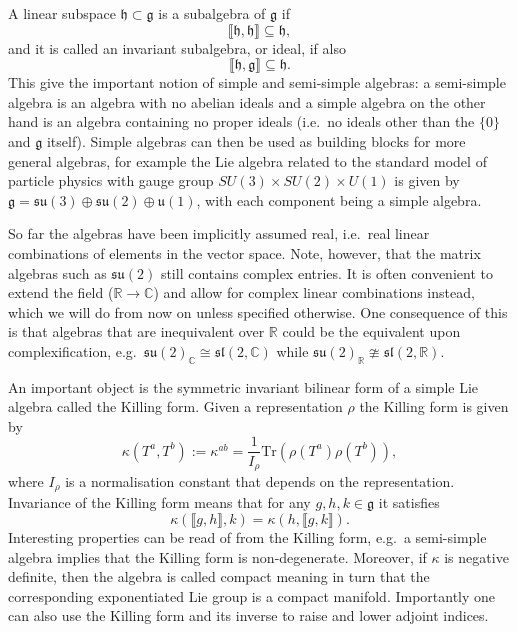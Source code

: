 A linear subspace $\mathfrak{h}\subset \mathfrak{g}$ is a subalgebra of $\mathfrak{g}$ if \begin{equation}
    \llbracket\mathfrak{h},\mathfrak{h}\rrbracket\subseteq \mathfrak{h},
\end{equation} 
and it is called an invariant subalgebra, or ideal, if also
\begin{equation}
    \llbracket\mathfrak{h},\mathfrak{g}\rrbracket\subseteq \mathfrak{h}.
\end{equation}
This give the important notion of simple and semi-simple algebras: a semi-simple algebra is an algebra with no abelian ideals and a simple algebra on the other hand is an algebra containing no proper ideals (i.e.\ no ideals other than the $\{0\}$ and $\mathfrak{g}$ itself). Simple algebras can then be used as building blocks for more general algebras, for example the Lie algebra related to the standard model of particle physics with gauge group $SU(3)\times SU(2)\times U(1)$ is given by $\mathfrak{g}=\mathfrak{su}(3)\oplus\mathfrak{su}(2)\oplus\mathfrak{u}(1)$, with each component being a simple algebra. 

So far the algebras have been implicitly assumed real, i.e.\ real linear combinations of elements in the vector space. Note, however, that the matrix algebras such as $\mathfrak{su}(2)$ still contains complex entries. It is often convenient to extend the field ($\mathbb{R}\to\mathbb{C}$) and allow for complex linear combinations instead, which we will do from now on unless specified otherwise. One consequence of this is that algebras that are inequivalent over $\mathbb{R}$ could be the equivalent upon complexification, e.g.\ $\mathfrak{su}(2)_\mathbb{C}\cong \mathfrak{sl}(2,\mathbb{C})$ while $\mathfrak{su}(2)_\mathbb{R}\ncong\mathfrak{sl}(2,\mathbb{\mathbb{R}})$. 

An important object is the symmetric invariant bilinear form of a simple Lie algebra called the Killing form. Given a representation $\rho$ the Killing form is given by 
\begin{equation}
    \kappa(T^a,T^b) := \kappa^{ab} = \frac{1}{I_\rho}\text{Tr}\left(\rho(T^a)\rho(T^b)\right),
\end{equation}
where $I_\rho$ is a normalisation constant that depends on the representation. Invariance of the Killing form means that for any $g,h,k\in\mathfrak{g}$ it satisfies 
\begin{equation}
    \kappa(\llbracket g,h\rrbracket,k) = \kappa(h,\llbracket g,k\rrbracket). 
\end{equation}
Interesting properties can be read of from the Killing form, e.g.\ a semi-simple algebra implies that the Killing form is non-degenerate. Moreover, if $\kappa$ is negative definite, then the algebra is called compact meaning in turn that the corresponding exponentiated Lie group is a compact manifold. Importantly one can also use the Killing form and its inverse to raise and lower adjoint indices. 


